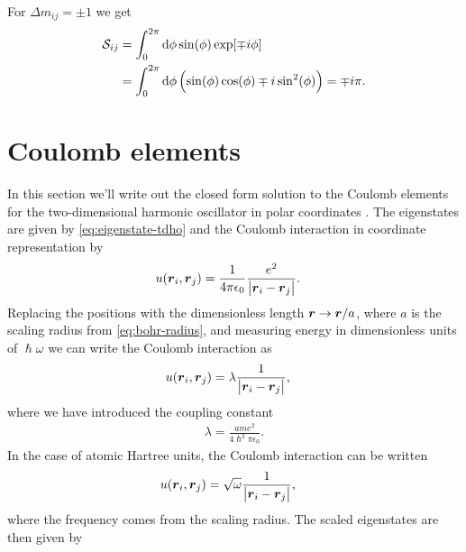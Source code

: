         For $\Delta m_{ij} = \pm 1$ we get
        \begin{align}
            \mathcal{S}_{ij}
            &=
            \int_{0}^{2\pi}
            \dd\phi
            \sin(\phi)
            \exp[\mp i\phi]
            \\
            &=
            \int_{0}^{2\pi}
            \dd\phi
            \left( 
                \sin(\phi)\cos(\phi)
                \mp i\sin^2(\phi)
             \right)
            = \mp i\pi.
        \end{align}


    \section{Coulomb elements}
        \label{app:coulomb-elements}
        In this section we'll write out the closed form solution to the Coulomb
        elements for the two-dimensional harmonic oscillator in polar
        coordinates \cite{anisimovas1998energy}.
        The eigenstates are given by \autoref{eq:eigenstate-tdho} and the
        Coulomb interaction in coordinate representation by
        \begin{align}
            u(\boldsymbol{r}_i, \boldsymbol{r}_j)
            &= \frac{1}{4\pi\epsilon_0}\frac{e^2}{\abs{\boldsymbol{r}_i - \boldsymbol{r}_j}}.
        \end{align}
        Replacing the positions with the dimensionless length $\boldsymbol{r} \to
        \boldsymbol{r}/a$, where $a$ is the scaling radius from \autoref{eq:bohr-radius},
        and measuring energy in dimensionless units of $\hslash \omega$
        \cite{anisimovas1998energy} we can write the Coulomb interaction as
        \begin{align}
            u(\boldsymbol{r}_i, \boldsymbol{r}_j)
            &= \lambda
            \frac{1}{\abs{\boldsymbol{r}_i - \boldsymbol{r}_j}},
        \end{align}
        where we have introduced the coupling constant
        \begin{align}
            \lambda = \frac{a m e^2}{4 \hslash^2 \pi \epsilon_0}.
        \end{align}
        In the case of atomic Hartree units, the Coulomb
        interaction can be written
        \begin{align}
            u(\boldsymbol{r}_i, \boldsymbol{r}_j)
            &= \sqrt{\omega}
            \frac{1}{\abs{\boldsymbol{r}_i - \boldsymbol{r}_j}},
        \end{align}
        where the frequency comes from the scaling radius.
        The scaled eigenstates are then given by
